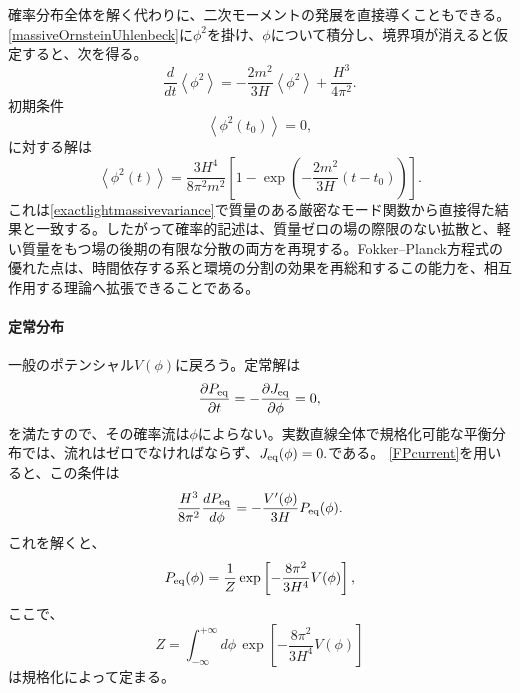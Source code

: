 \documentclass[a4paper,11pt,oneside]{article}
\theoremstyle{definition}
\numberwithin{equation}{section}
\begin{document}
確率分布全体を解く代わりに、二次モーメントの発展を直接導くこともできる。\eqref{massiveOrnsteinUhlenbeck}に\(\phi^{2}\)を掛け、\(\phi\)について積分し、境界項が消えると仮定すると、次を得る。
\begin{equation}
\frac{d}{dt}
\left\langle
\phi^{2}
\right\rangle
=
-
\frac{2m^{2}}{3H}
\left\langle
\phi^{2}
\right\rangle
+
\frac{H^{3}}{4\pi^{2}}.
\label{massivesecondmomentequation}
\end{equation}
初期条件
\begin{equation}
\left\langle
\phi^{2}(t_{0})
\right\rangle
=
0,
\end{equation}
に対する解は
\begin{equation}
\left\langle
\phi^{2}(t)
\right\rangle
=
\frac{3H^{4}}{8\pi^{2}m^{2}}
\left[
1
-
\exp\left(
-\frac{2m^{2}}{3H}
(t-t_{0})
\right)
\right].
\label{massiveFPvariance}
\end{equation}
これは\eqref{exactlightmassivevariance}で質量のある厳密なモード関数から直接得た結果と一致する。したがって確率的記述は、質量ゼロの場の際限のない拡散と、軽い質量をもつ場の後期の有限な分散の両方を再現する。Fokker--Planck方程式の優れた点は、時間依存する系と環境の分割の効果を再総和するこの能力を、相互作用する理論へ拡張できることである。





\paragraph{定常分布}



一般のポテンシャル\(V(\phi)\)に戻ろう。定常解は
\begin{equation}
\frac{\partial P_{\rm eq}}{\partial t}
=-\frac{\partial J_{\rm eq}}{\partial \phi} =0,
\end{equation}
を満たすので、その確率流は\(\phi\)によらない。実数直線全体で規格化可能な平衡分布では、流れはゼロでなければならず、\(
J_{\rm eq}(\phi)
=
0.
\)である。
\eqref{FPcurrent}を用いると、この条件は
\begin{equation}
\frac{H^{3}}{8\pi^{2}}
\frac{dP_{\rm eq}}{d\phi}
=
-
\frac{V'(\phi)}{3H}
P_{\rm eq}(\phi).
\end{equation}
これを解くと、
\begin{equation}
P_{\rm eq}(\phi)
=
\frac{1}{Z}
\exp\left[
-
\frac{8\pi^{2}}{3H^{4}}
V(\phi)
\right],
\label{StarobinskyYokoyamaDistribution}
\end{equation}
ここで、
\begin{equation}
Z
=
\int_{-\infty}^{+\infty}
d\phi\,
\exp\left[
-
\frac{8\pi^{2}}{3H^{4}}
V(\phi)
\right]
\end{equation}
は規格化によって定まる。
\end{document}
